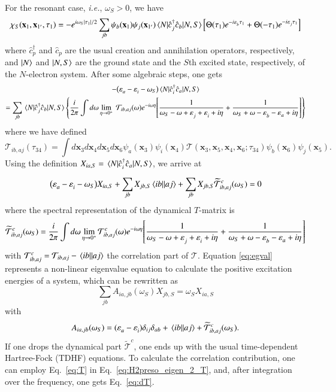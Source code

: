 \documentclass[aip,jcp,reprint,noshowkeys,superscriptaddress]{revtex4-1}
\newcommand{\ie}{\textit{i.e.}}
\newcommand{\bx}{\mathbf{x}}
\newcommand{\e}[2]{\eps_{#1}^{#2}}
\newcommand{\SO}[1]{\psi_{#1}}
\newcommand{\eps}{\varepsilon}
\newcommand{\cT}{\mathcal{T}}
\begin{document}
For the resonant case, \ie, $\omega_S>0$, we have
\begin{equation}
\label{eq:chi_tau}
	\chi_S(\bx_1,\bx_{1'},\tau_1) 
	=-e^{i\omega_S\abs{\tau_1}/2} \sum_{jb}\SO{b}(\bx_1)\SO{j}(\bx_{1'}) \mel{N}{\hat{c}^\dagger_{j}\hat{c}_b}{N,S}
  	\qty[\Theta(\tau_1)e^{-i\e{b}{}\tau_1}+\Theta(-\tau_1)e^{-i\e{j}{}\tau_1} ]
\end{equation}
  where $\hat{c}^\dagger_{p}$ and $\hat{c}_p$ are the usual creation and annihilation operators, respectively, and $\ket{N}$ and $\ket{N,S}$ are the ground state and the $S$th excited state, respectively, of the $N$-electron system.
After some algebraic steps, one gets
\begin{multline}
	-\qty(\e{a}{}-\e{i}{}-\omega_S)\mel{N}{\hat{c}^\dagger_{i}\hat{c}_a}{N,S}
	\\
    = \sum_{jb}\mel{N}{\hat{c}^\dagger_{j}\hat{c}_b}{N,S}
    \qty{ \frac{i}{2\pi}\int d\omega \lim_{\eta \to 0^+}\ \cT_{ib,aj}(\omega) e^{-i\omega\eta} \qty[\frac{1}{\omega_S-\omega+\e{j}{}+\e{i}{}+i\eta}+\frac{1}{\omega_S+\omega-\e{b}{}-\e{a}{}+i\eta} ] }
\end{multline}
where we have defined 
\begin{equation}
	\cT_{ib,aj}(\tau_{34})=\int d\bx_3 d\bx_4 d\bx_5 d\bx_6 \SO{a}(\bx_3) \SO{i}(\bx_4)\cT(\bx_3,\bx_5,\bx_4,\bx_6;\tau_{34}) \SO{b}(\bx_6)\SO{j}(\bx_5).
\end{equation}
Using the definition $X_{ia,S}=\mel{N}{\hat{c}^\dagger_{i}\hat{c}_a}{N,S}$, we arrive at

\begin{equation}
	\label{eq:egval}
	\qty(\e{a}{}-\e{i}{}-\omega_S) X_{ia,S}+\sum_{jb}X_{jb,S}\mel{ib}{}{aj} + \sum_{jb}X_{jb,S}\widetilde{\cT}^c_{ib,aj}(\omega_S)=0
\end{equation}
where the spectral representation of the dynamical $T$-matrix is
\begin{equation}
	\widetilde{\cT}^c_{ib,aj}(\omega_S)
	= \frac{i}{2\pi}\int d\omega \lim_{\eta \to 0^+}\cT^c_{ib,aj}(\omega)e^{-i\omega\eta} \qty[\frac{1}{\omega_S-\omega+\e{j}{}+\e{i}{}+i\eta}+\frac{1}{\omega_S+\omega-\e{b}{}-\e{a}{}+i\eta}] 
 \label{eq:H2preso_eigen_2_T}
\end{equation}
with $\cT^c_{ib,aj}=\cT_{ib,aj}-\mel{ib}{}{aj}$ the correlation part of $\cT$. 
Equation \eqref{eq:egval} represents a non-linear eigenvalue equation to calculate the positive excitation energies of a system, which can be rewritten as
\begin{equation}
\label{eq:H2preso_eigen}
	\sum_{jb} A_{ia,jb}(\omega_S) X_{jb,S}=\omega_S X_{ia,S}
\end{equation}
with
\begin{equation}
	A_{ia,jb}(\omega_S)=(\e{a}{}-\e{i}{})\delta_{ij}\delta_{ab} + \mel{ib}{}{aj} + \widetilde{\cT}^c_{ib,aj}(\omega_S).
\end{equation}
If one drops the dynamical part $\widetilde{\cT}^c$, one ends up with the usual time-dependent Hartree-Fock (TDHF) equations. \cite{Dreuw_2005} To calculate the correlation contribution, one can employ Eq.~\eqref{eq:T} in Eq.~\eqref{eq:H2preso_eigen_2_T}, and, after integration over the frequency, one gets Eq.~\eqref{eq:dT}.
\end{document}
